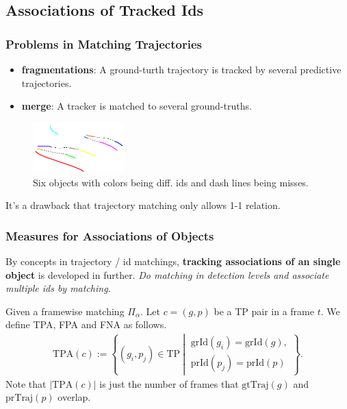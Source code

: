 \documentclass[slidetop, mathserif]{beamer}
\begin{document}
\subsection{Associations of Tracked Ids}

\begin{frame}
	\frametitle{Problems in Matching Trajectories}
			
	\begin{itemize}
		\item {\bf fragmentations}:
		      A ground-turth trajectory is tracked by
		      several predictive trajectories.
		\item {\bf merge}:
		      A tracker is matched to several ground-truths.
	\end{itemize}
		
	\begin{figure}
		\includegraphics[width=100pt]{pics/fig9.png}
		\caption{Six objects with colors being diff. ids and dash lines being misses.}
	\end{figure}
		
	\vspace{-15pt}
	It's a drawback that trajectory matching only allows 1-1 relation.
			
\end{frame}

\begin{frame}
	\frametitle{Measures for Associations of Objects}
			
	By concepts in trajectory / id matchings,
	{\bf tracking associations of an single object} is developed in further.
	\emph{Do matching in detection levels and associate multiple ids by matching.}
			
	\vspace{4pt}
			
	Given a framewise matching $\Pi_\alpha$.
	Let $c = (g,p)$ be a TP pair in a frame $t$.
	We define TPA, FPA and FNA as follows.
	\begin{align*}
		\text{TPA}(c) :=                       
		\left\{(g_i, p_j)\in\text{TP}\ \left|\ 
		\begin{array}{c}                       
		\text{grId}(g_i)=\text{grId}(g),       \\
		\text{prId}(p_j) = \text{prId}(p)      
		\end{array}\right.                     
		\right\}.                              
	\end{align*}
	Note that $|\text{TPA}(c)|$ is just the number of frames that $\text{gtTraj}(g)$
	and $\text{prTraj}(p)$ overlap.
			
\end{frame}
\end{document}
